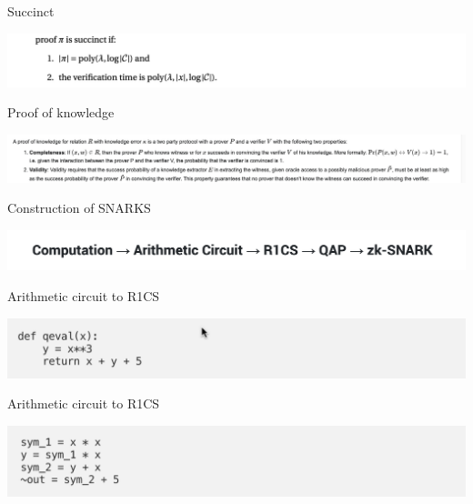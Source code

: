 \documentclass{beamer}
\begin{document}
\begin{frame}{Succinct}
	\begin{minipage}{0.42\linewidth}
		\includegraphics[scale=0.45]{a0.png}
	\end{minipage}
\end{frame}



\begin{frame}{Proof of knowledge}
	\begin{minipage}{0.42\linewidth}
		\includegraphics[scale=0.25]{a1.png}
	\end{minipage}
\end{frame}


\begin{frame}{Construction of SNARKS}
	\begin{minipage}{0.42\linewidth}
		\includegraphics[scale=0.45]{a2.png}
	\end{minipage}
\end{frame}


\begin{frame}{Arithmetic circuit to R1CS}
	\begin{minipage}{0.42\linewidth}
		\includegraphics[scale=0.45]{a3.png}
	\end{minipage}
\end{frame}

\begin{frame}{Arithmetic circuit to R1CS}
	\begin{minipage}{0.42\linewidth}
		\includegraphics[scale=0.45]{a4.png}
	\end{minipage}
\end{frame}
\end{document}
